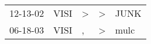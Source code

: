 \begin{supertabular}{p{0.07\textwidth}p{0.06\textwidth}p{0.02\textwidth}p{0.02\textwidth}p{0.06\textwidth}}
 12-13-02\textsuperscript{} &  VISI\textsuperscript{} &  \textgreater &  \textgreater &  JUNK\textsuperscript{} \\
 06-18-03\textsuperscript{} &  VISI\textsuperscript{} &             , &  \textgreater &  mulc\textsuperscript{} \\
\end{supertabular}
